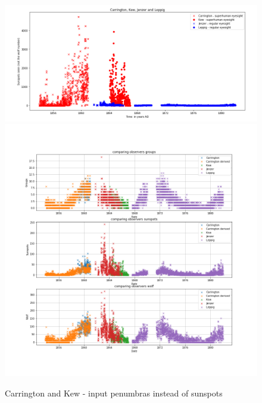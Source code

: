 \documentclass[12pt]{article}
\begin{document}
\begin{figure}[H]
  \includegraphics[width=0.93\linewidth]{CarringtonHasGoodEyesight.png}
  \includegraphics[width=0.9\linewidth]{carrington_kew_after_fix.png}
  \caption{Carrington and Kew - input penumbras instead of sunspots}
  \label{fig:carrington-kew-penumbras}
\end{figure}
\end{document}
